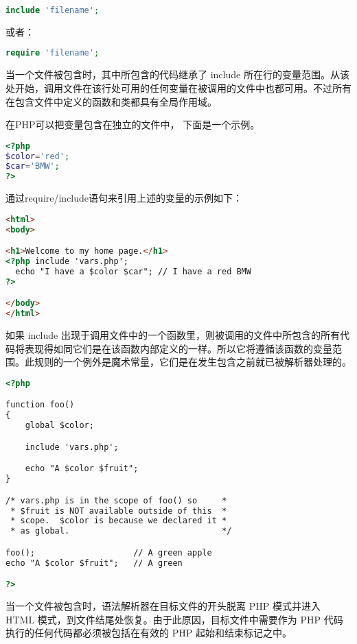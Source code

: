 \begin{lstlisting}[language=PHP]
include 'filename';
\end{lstlisting}

或者：

\begin{lstlisting}[language=PHP]
require 'filename';
\end{lstlisting}

当一个文件被包含时，其中所包含的代码继承了 include 所在行的变量范围。从该处开始，调用文件在该行处可用的任何变量在被调用的文件中也都可用。不过所有在包含文件中定义的函数和类都具有全局作用域。





在PHP可以把变量包含在独立的文件中， 下面是一个示例。

\begin{lstlisting}[language=PHP]
<?php
$color='red';
$car='BMW';
?>
\end{lstlisting}


通过require/include语句来引用上述的变量的示例如下：


\begin{lstlisting}[language=HTML]
<html>
<body>

<h1>Welcome to my home page.</h1>
<?php include 'vars.php';
  echo "I have a $color $car"; // I have a red BMW
?>

</body>
</html>
\end{lstlisting}

如果 include 出现于调用文件中的一个函数里，则被调用的文件中所包含的所有代码将表现得如同它们是在该函数内部定义的一样。所以它将遵循该函数的变量范围。此规则的一个例外是魔术常量，它们是在发生包含之前就已被解析器处理的。

\begin{lstlisting}[language=HTML]
<?php

function foo()
{
    global $color;

    include 'vars.php';

    echo "A $color $fruit";
}

/* vars.php is in the scope of foo() so     *
 * $fruit is NOT available outside of this  *
 * scope.  $color is because we declared it *
 * as global.                               */

foo();                    // A green apple
echo "A $color $fruit";   // A green

?>
\end{lstlisting}

当一个文件被包含时，语法解析器在目标文件的开头脱离 PHP 模式并进入 HTML 模式，到文件结尾处恢复。由于此原因，目标文件中需要作为 PHP 代码执行的任何代码都必须被包括在有效的 PHP 起始和结束标记之中。

